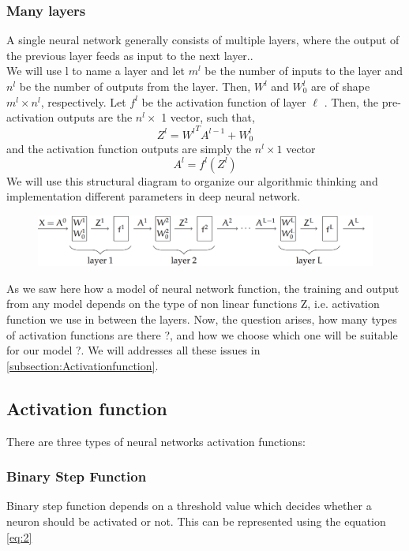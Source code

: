 \subsubsection{Many layers}

A single neural network generally consists of multiple layers, where the output of the previous layer feeds as input to the next layer..\\
 We will use l to name a layer and 
let $m^l$ be the  number of inputs to the layer and $n^l$ be the number of outputs from the layer. Then, $W^l$ and $W^l _0$ are of shape $m^l \times n^l$, respectively. Let $f^l$ be the activation
function of layer  $ \ell$ . Then, the pre-activation outputs are the $n^l \times$ 1 vector, such that,
\begin{equation*}
    Z^l = {W^l}^T A^{l-1} + W_0^l
\end{equation*}
and the activation function outputs are simply the $n^l \times 1$ vector
\begin{equation*}
    A^l = f^l(Z^l)
\end{equation*}
We will use this structural diagram to organize our algorithmic thinking and implementation different parameters in deep neural network.
\begin{figure}[H]
    \centering
    \includegraphics[scale=0.3]{Figure/ml__3.png}
    \label{fig:my_label}
\end{figure}

As we saw here how a model of neural network function, the training and output from any model depends on the type of non linear functions Z, i.e. activation function we use in between the layers. Now, the question arises, how many types of activation functions are there ?, and how we choose which one will be suitable for our model ?. We will addresses all these issues in \autoref{subsection:Activationfunction}.

\subsection{ Activation function}
\label{subsection:Activationfunction}
There are three types of neural networks activation functions\cite{https://doi.org/10.48550/arxiv.1811.03378}:
\subsubsection{Binary Step Function}
Binary step function depends on a threshold value which decides whether a neuron should be activated or not. This can be represented using the equation \autoref{eq:2}


